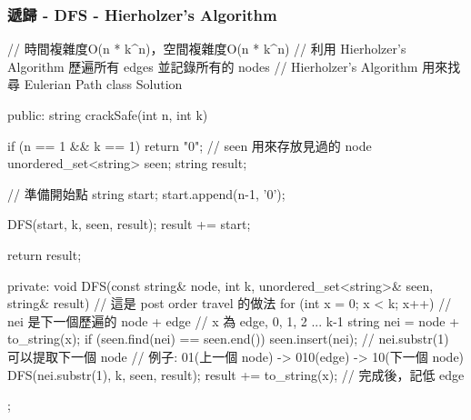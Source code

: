 \subsubsection{遞歸 - DFS - Hierholzer's Algorithm}
\begin{Code}
// 時間複雜度O(n * k^n)，空間複雜度O(n * k^n)
// 利用 Hierholzer's Algorithm 歷遍所有 edges 並記錄所有的 nodes
// Hierholzer's Algorithm 用來找尋 Eulerian Path
class Solution {
public:
    string crackSafe(int n, int k) {
        if (n == 1 && k == 1) return "0";
        // seen 用來存放見過的 node
        unordered_set<string> seen;
        string result;

        // 準備開始點
        string start; start.append(n-1, '0');

        DFS(start, k, seen, result);
        result += start;

        return result;
    }
private:
    void DFS(const string& node, int k, unordered_set<string>& seen, string& result)
    {
        // 這是 post order travel 的做法
        for (int x = 0; x < k; x++)
        {
            // nei 是下一個歷遍的 node + edge
            // x 為 edge, 0, 1, 2 ... k-1
            string nei = node + to_string(x);
            if (seen.find(nei) == seen.end())
            {
                seen.insert(nei);
                // nei.substr(1) 可以提取下一個 node
                // 例子: 01(上一個 node) -> 010(edge) -> 10(下一個 node)
                DFS(nei.substr(1), k, seen, result);
                result += to_string(x); // 完成後，記低 edge
            }
        }
    }
};
\end{Code}

